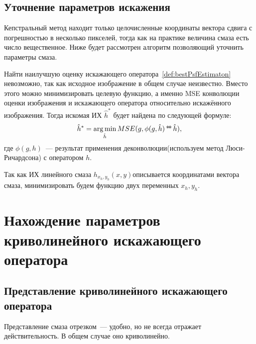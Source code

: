 \subsection{Уточнение параметров искажения}
Кепстральный метод находит только целочисленные координаты вектора сдвига с погрешностью в несколько пикселей, тогда как на практике величина смаза есть число вещественное. Ниже будет рассмотрен алгоритм позволяющий уточнить параметры смаза.

Найти наилучшую оценку искажающего оператора~\ref{def:bestPsfEstimaton} невозможно, так как исходное изображение в общем случае неизвестно. Вместо этого можно минимизировать целевую функцию, а именно MSE конволюции оценки изображения и искажающего оператора относительно искажённого изображения. Тогда искомая ИХ $\hat{h}^*$ будет найдена по следующей формуле:
\begin{equation}\label{eq:bestPsfModified}
\hat{h}^* = \operatorname*{arg\,min}_{\hat{h}} MSE(g, \phi(g,\hat{h}) \operatorname*{*\!*} \hat{h}),
\end{equation}
где $\phi(g, h)$~--- результат применения деконволюции(используем метод Люси-Ричардсона) с оператором $h$.

Так как ИХ линейного смаза $h_{x_h,y_h}(x,y)$описывается координатами вектора смаза, минимизировать будем функцию двух переменных $x_h, y_h$.

\section{Нахождение параметров криволинейного искажающего оператора}

\subsection{Представление криволинейного искажающего оператора}
Представление смаза отрезком~--- удобно, но не всегда отражает действительность. В общем случае оно криволинейно.

